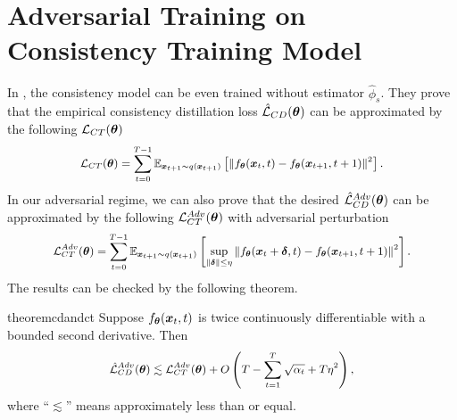 \section{Adversarial Training on Consistency Training Model}

In \citep{song2023consistency}, the consistency model can be even trained without estimator $\hat{\phi}_{s}$. They prove that the empirical consistency distillation loss $\hat{\mathcal{L}}_{CD}(\boldsymbol{\theta})$ can be approximated by the following $\mathcal{L}_{CT}(\boldsymbol{\theta})$
\begin{equation}
    \small
        \mathcal{L}_{CT}(\boldsymbol{\theta}) = \sum_{t = 0}^{T - 1}\mathbb{E}_{\boldsymbol{x}_{t + 1}\sim q(\boldsymbol{x}_{t + 1})}\left[\left\|f_{\boldsymbol{\theta}}(\boldsymbol{x}_{t}, t) - f_{\boldsymbol{\theta}}(\boldsymbol{x}_{t + 1}, t + 1)\right\|^{2}\right].
\end{equation}
In our adversarial regime, we can also prove that the desired $\hat{\mathcal{L}}_{CD}^{Adv}(\boldsymbol{\theta})$ can be approximated by the following $\mathcal{L}_{CT}^{Adv}(\boldsymbol{\theta})$ with adversarial perturbation
\begin{equation}
    \small
        \mathcal{L}_{CT}^{Adv}(\boldsymbol{\theta}) = \sum_{t = 0}^{T - 1}\mathbb{E}_{\boldsymbol{x}_{t + 1}\sim q(\boldsymbol{x}_{t + 1})}\left[\sup_{\|\boldsymbol{\delta}\|\leq \eta}\left\|f_{\boldsymbol{\theta}}(\boldsymbol{x}_{t} + \boldsymbol{\delta}, t) - f_{\boldsymbol{\theta}}(\boldsymbol{x}_{t + 1}, t + 1)\right\|^{2}\right].
\end{equation}
The results can be checked by the following theorem. 
\begin{restatable}{theorem}{cdandct}\label{thm:cd and ct gap}
    Suppose $f_{\boldsymbol{\theta}}(\boldsymbol{x}_{t}, t)$ is twice continuously differentiable with a bounded second derivative. Then 
    \begin{equation}
        \small
            \hat{\mathcal{L}}_{CD}^{Adv}(\boldsymbol{\theta}) \lesssim \mathcal{L}_{CT}^{Adv}(\boldsymbol{\theta}) +  O\left(T - \sum_{t=1}^{T}\sqrt{\alpha_{t}} + T\eta^{2}\right), 
    \end{equation}
    where ``$\lesssim$'' means approximately less than or equal.  
\end{restatable}

